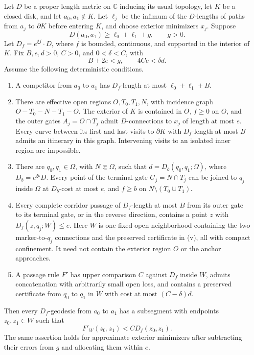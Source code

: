 \begin{lemma}\label{comp:gate-forcing}
Let $D$ be a proper length metric on $\mathbb C$ inducing its usual
topology, let $K$ be a closed disk, and let $a_0,a_1\notin K$.
Let $\ell_j$ be the infimum of the $D$-lengths of paths from $a_j$ to
$\partial K$ before entering $K$, and choose exterior minimizers $x_j$.
Suppose
\[
 D(a_0,a_1)\ge \ell_0+\ell_1+g,\qquad g>0.
\]
Let $D_f=e^{\xi f}\cdot D$, where $f$ is bounded, continuous, and
supported in the interior of $K$.  Fix $B,e,d>0$, $C>0$, and
$0<\delta<C$, with
\[
 B+2e<g,\qquad 4Ce<\delta d.
\]
Assume the following deterministic conditions.
\begin{enumerate}[label=(\roman*)]
\item A competitor from $a_0$ to $a_1$ has $D_f$-length at most
      $\ell_0+\ell_1+B$.
\item There are effective open regions $O,T_0,T_1,N$, with incidence
      graph $O-T_0-N-T_1-O$.  The exterior of $K$ is contained in $O$,
      $f\ge0$ on $O$, and the outer gates
      $A_j=O\cap T_j$ admit $D$-connections to $x_j$ of length at most
      $e$.  Every curve between its first and last visits to
      $\partial K$ with $D_f$-length at most $B$ admits an itinerary
      in this graph.  Intervening visits to an isolated inner region
      are impossible.
\item There are $q_0,q_1\in\Omega$, with
      $N\Subset\Omega$, such that
      $d=D_b(q_0,q_1;\Omega)$, where $D_b=e^{\xi b}D$.
      Every point of the terminal gate $G_j=N\cap T_j$ can be joined
      to $q_j$ inside $\Omega$ at $D_b$-cost at most $e$, and
      $f\ge b$ on $N\setminus(T_0\cup T_1)$.
\item Every complete corridor passage of $D_f$-length at most $B$
      from its outer gate to its terminal gate, or in the reverse
      direction, contains a point
      $z$ with $D_f(z,q_j;W)\le e$.  Here $W$ is one fixed open
      neighborhood containing the two marker-to-$q_j$ connections
      and the preserved certificate in (v), all with compact
      confinement.  It need not contain the exterior region $O$
      or the anchor approaches.
\item A passage rule $F'$ has upper comparison $C$ against $D_f$
      inside $W$, admits concatenation with arbitrarily small open
      loss, and contains a preserved certificate from $q_0$ to $q_1$
      in $W$ with cost at most $(C-\delta)d$.
\end{enumerate}
Then every $D_f$-geodesic from $a_0$ to $a_1$ has a subsegment
with endpoints $z_0,z_1\in W$ such that
\[
 F'_W(z_0,z_1)<C D_f(z_0,z_1).
\]
The same assertion holds for approximate exterior minimizers after
subtracting their errors from $g$ and allocating them within $e$.
\end{lemma}

